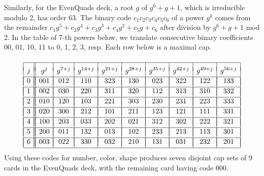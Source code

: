 \documentclass[12pt]{amsart}
\theoremstyle{definition}
\begin{document}
Similarly, for the EvenQuads deck, a root $g$ of $g^6+g+1$, which is
irreducible modulo 2, has order 63.  The binary code
$c_1c_2c_3c_4c_5c_6$ of a power $g^k$ comes from the remainder
$c_1g^5+c_2g^4+c_3g^3+c_4g^2+c_5g+c_6$ after division by $g^6+g+1$ mod
2. In the table of 7-th powers below, we translate consecutive binary
coefficients 00, 01, 10, 11 to 0, 1, 2, 3, resp. Each row below is a
maximal cap.
$$
\begin{array}[t]{|c||*{9}{c|}}\hline
  &&&&&&&&& \\[-6pt]
  j&g^j&g^{7+j}&g^{14+j}&g^{21+j}&g^{28+j}&g^{35+j}&g^{42+j}&g^{49+j}&g^{56+j}
  \\[2pt]\hline
  &&&&&&&&& \\[-12pt]
  0& 001 &012 &110 &323 &130 &023 &322 &122 &133 \\[2pt]\hline
  &&&&&&&&& \\[-12pt]
  1& 002 &030 &220 &311 &320 &112 &313 &310 &332 \\[2pt]\hline
  &&&&&&&&& \\[-12pt]
  2& 010 &120 &103 &221 &303 &230 &231 &223 &333 \\[2pt]\hline
  &&&&&&&&& \\[-12pt]
  3& 020 &300 &212 &101 &211 &123 &121 &111 &331 \\[2pt]\hline
  &&&&&&&&& \\[-12pt]
  4& 100 &203 &033 &202 &021 &312 &302 &222 &321 \\[2pt]\hline
  &&&&&&&&& \\[-12pt]
  5& 200 &011 &132 &013 &102 &233 &213 &113 &301 \\[2pt]\hline
  &&&&&&&&& \\[-12pt]
  6& 003 &022 &330 &032 &210 &131 &031 &232 &201 \\[2pt]\hline
\end{array}
$$
Using these codes for number, color, shape produces seven disjoint cap
sets of 9 cards in the EvenQuads deck, with the remaining card having
code 000.

\newcommand{\etalchar}[1]{$^{#1}$}
\providecommand{\bysame}{\leavevmode\hbox to3em{\hrulefill}\thinspace}
\providecommand{\href}[2]{#2}
\end{document}
